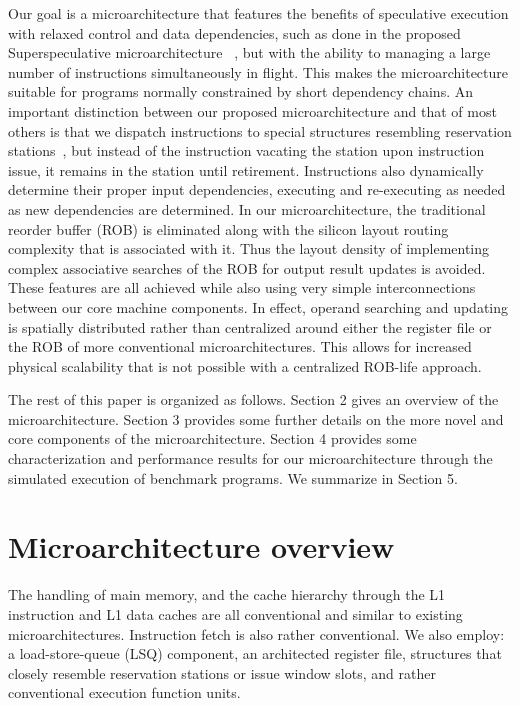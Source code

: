 \documentclass[10pt,twocolumn,dvips]{article}
\begin{document}
Our goal is a microarchitecture
that features the benefits of speculative execution with 
relaxed control and data dependencies,
such as done in the proposed Superspeculative 
microarchitecture ~\cite{Lip97}, but with the ability
to managing a large number of instructions simultaneously in flight.
This makes the microarchitecture
suitable for programs normally constrained by short dependency chains.
An important distinction between our proposed microarchitecture and
that of most others is that we dispatch instructions to special structures
resembling reservation stations~\cite{Anderson67,Tom67},
but instead of the instruction
vacating the station upon instruction issue, it
remains in the station until retirement.
Instructions also
dynamically determine their proper input dependencies,
executing and re-executing as needed as new dependencies
are determined.
In our microarchitecture, the traditional reorder buffer (ROB)
is eliminated along with the silicon layout routing complexity
that is associated with it.  
Thus the layout density of implementing
complex associative searches of the ROB for output result updates
is avoided.
These features are all achieved while also using very
simple interconnections between our core machine components.
In effect, operand searching and updating is spatially distributed
rather than centralized around either the register file or the ROB
of more conventional microarchitectures.
This allows for increased physical scalability that is not possible with
a centralized ROB-life approach.

The rest of this paper is organized as follows.
Section 2 gives an overview of the microarchitecture.
Section 3 provides some further details on the more
novel and core components of the microarchitecture.
Section 4 provides some characterization and performance 
results for our microarchitecture through the simulated
execution of benchmark programs.
We summarize in Section 5.
%
\vspace{-0.15in}
\section{Microarchitecture overview}
%
The handling of main memory, and the cache hierarchy 
through the L1 instruction and L1 data caches are all
conventional and similar to existing microarchitectures.
Instruction fetch is also rather conventional.
We also employ: a
load-store-queue (LSQ) component, an architected register file,
structures that closely resemble reservation stations or issue
window slots, and rather conventional execution function units.
\end{document}
